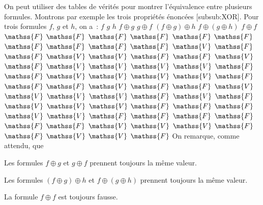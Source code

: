 On peut utiliser des tables de vérités pour montrer l'équivalence entre plusieurs formules. 
Montrons par exemple les trois propriétés énoncées [subsub:XOR]. 
Pour trois formules $f$, $g$ et $h$, on a :
\startplacetable[location=force,number=no]
  \bTABLE[setups=fTable]
    \bTR\bTD $f$ \eTD\bTD $g$ \eTD\bTD $h$ \eTD\bTD $f \oplus g$ \eTD\bTD $g \oplus f$ \eTD\bTD $(f \oplus g) \oplus h$ \eTD\bTD $f \oplus (g \oplus h)$ \eTD\bTD $f \oplus f$ \eTD\eTR
    \bTR\bTD $\mathss{F}$ \eTD\bTD $\mathss{F}$ \eTD\bTD $\mathss{F}$ \eTD\bTD $\mathss{F}$ \eTD\bTD $\mathss{F}$ \eTD\bTD $\mathss{F}$ \eTD\bTD $\mathss{F}$ \eTD\bTD $\mathss{F}$ \eTD\eTR
    \bTR\bTD $\mathss{F}$ \eTD\bTD $\mathss{F}$ \eTD\bTD $\mathss{V}$ \eTD\bTD $\mathss{F}$ \eTD\bTD $\mathss{F}$ \eTD\bTD $\mathss{V}$ \eTD\bTD $\mathss{V}$ \eTD\bTD $\mathss{F}$ \eTD\eTR
    \bTR\bTD $\mathss{F}$ \eTD\bTD $\mathss{V}$ \eTD\bTD $\mathss{F}$ \eTD\bTD $\mathss{V}$ \eTD\bTD $\mathss{V}$ \eTD\bTD $\mathss{V}$ \eTD\bTD $\mathss{V}$ \eTD\bTD $\mathss{F}$ \eTD\eTR
    \bTR\bTD $\mathss{F}$ \eTD\bTD $\mathss{V}$ \eTD\bTD $\mathss{V}$ \eTD\bTD $\mathss{V}$ \eTD\bTD $\mathss{V}$ \eTD\bTD $\mathss{F}$ \eTD\bTD $\mathss{F}$ \eTD\bTD $\mathss{F}$ \eTD\eTR
    \bTR\bTD $\mathss{V}$ \eTD\bTD $\mathss{F}$ \eTD\bTD $\mathss{F}$ \eTD\bTD $\mathss{V}$ \eTD\bTD $\mathss{V}$ \eTD\bTD $\mathss{V}$ \eTD\bTD $\mathss{V}$ \eTD\bTD $\mathss{F}$ \eTD\eTR
    \bTR\bTD $\mathss{V}$ \eTD\bTD $\mathss{F}$ \eTD\bTD $\mathss{V}$ \eTD\bTD $\mathss{V}$ \eTD\bTD $\mathss{V}$ \eTD\bTD $\mathss{F}$ \eTD\bTD $\mathss{F}$ \eTD\bTD $\mathss{F}$ \eTD\eTR
    \bTR\bTD $\mathss{V}$ \eTD\bTD $\mathss{V}$ \eTD\bTD $\mathss{F}$ \eTD\bTD $\mathss{F}$ \eTD\bTD $\mathss{F}$ \eTD\bTD $\mathss{F}$ \eTD\bTD $\mathss{F}$ \eTD\bTD $\mathss{F}$ \eTD\eTR
    \bTR\bTD $\mathss{V}$ \eTD\bTD $\mathss{V}$ \eTD\bTD $\mathss{V}$ \eTD\bTD $\mathss{F}$ \eTD\bTD $\mathss{F}$ \eTD\bTD $\mathss{V}$ \eTD\bTD $\mathss{V}$ \eTD\bTD $\mathss{F}$ \eTD\eTR
  \eTABLE
\stopplacetable
On remarque, comme attendu, que
\startitemize[nowhite]
  \item Les formules $f \oplus g$ et $g \oplus f$ prennent toujours la même valeur.
  \item Les formules $(f \oplus g) \oplus h$ et $f \oplus (g \oplus h)$ prennent toujours la même valeur.
  \item La formule $f \oplus f$ est toujours fausse.
\stopitemize

\stopsubsection


\startsubsection[title=Quelques propriétés]

